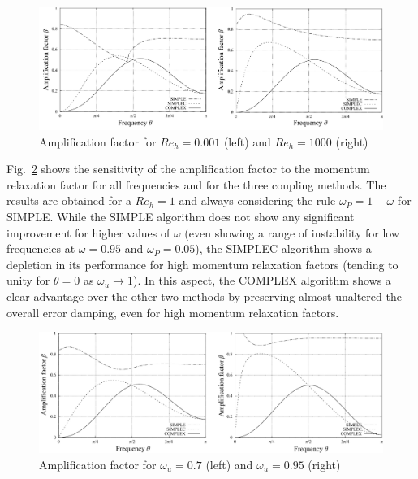 \documentclass[final,3p,times,11pt,onecolumn]{myElsarticle}
\numberwithin{equation}{section}
\begin{document}
\begin{figure}[t!!]
    \centering
    \includegraphics[width=\textwidth]{fig/Re_fourier.pdf}
    \caption{Amplification factor for $Re_h=0.001$ (left) and $Re_h=1000$ (right)}
    \label{fig:1a}
\end{figure}
    
Fig.~\ref{fig:1b} shows the sensitivity of the amplification factor to the momentum relaxation factor for all frequencies and for the three coupling methods. The results are obtained for a $Re_h=1$ and always considering the rule $\omega_P = 1 - \omega$ for SIMPLE. While the SIMPLE algorithm does not show any significant improvement for higher values of $\omega$ (even showing a range of instability for low frequencies at $\omega=0.95$ and $\omega_P=0.05$), the SIMPLEC algorithm shows a depletion in its performance for high momentum relaxation factors (tending to unity for $\theta=0$ as $\omega_u \rightarrow 1$). In this aspect, the COMPLEX algorithm shows a clear advantage over the other two methods by preserving almost unaltered the overall error damping, even for high momentum relaxation factors.     
    
\begin{figure}[t!!]
    \centering
    \includegraphics[width=\textwidth]{fig/w_fourier.pdf}
    \caption{Amplification factor for $\omega_u=0.7$ (left) and $\omega_u=0.95$ (right)}
    \label{fig:1b}
\end{figure}    
\end{document}
